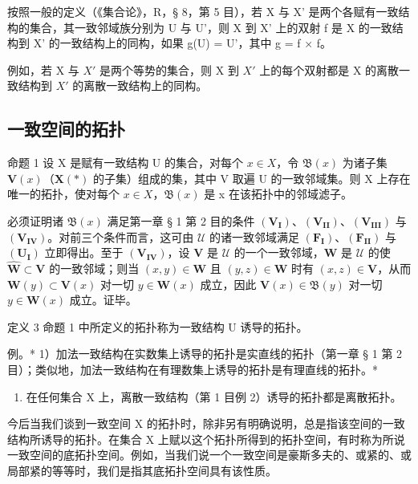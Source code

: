 按照一般的定义（《集合论》，R，§ 8，第 5 目），若 X 与 X' 是两个各赋有一致结构的集合，其一致邻域族分别为 U 与 U'，则 X 到 X' 上的双射 f 是 X 的一致结构到 X' 的一致结构上的同构，如果 g(U) = U'，其中 g = f × f。

例如，若 X 与 \(X'\) 是两个等势的集合，则 X 到 \(X'\) 上的每个双射都是 X 的离散一致结构到 \(X'\) 的离散一致结构上的同构。

\subsection{一致空间的拓扑}

命题 1 设 X 是赋有一致结构 U 的集合，对每个 \(x \in X\)，令 \(\mathfrak{B}(x)\) 为诸子集 \(\mathbf{V}(x)\)（\(\mathbf{X}(*)\) 的子集）组成的集，其中 V 取遍 U 的一致邻域集。则 X 上存在唯一的拓扑，使对每个 \(x \in X\)，\(\mathfrak{B}(x)\) 是 x 在该拓扑中的邻域滤子。

必须证明诸 \(\mathfrak{B}(x)\) 满足第一章 § 1 第 2 目的条件 \((\mathbf{V}_{\mathbf{I}})\)、\((\mathbf{V}_{\mathbf{II}})\)、\((\mathbf{V}_{\mathbf{III}})\) 与 \((\mathbf{V}_{\mathbf{IV}})\)。对前三个条件而言，这可由 \(\mathcal{U}\) 的诸一致邻域满足 \((\mathbf{F}_{\mathbf{I}})\)、\((\mathbf{F}_{\mathbf{II}})\) 与 \((\mathbf{U}_{\mathbf{I}})\) 立即得出。至于 \((\mathbf{V}_{\mathbf{IV}})\)，设 \(\mathbf{V}\) 是 \(\mathcal{U}\) 的一个一致邻域，\(\mathbf{W}\) 是 \(\mathcal{U}\) 的使 \(\hat{\mathbf{W}} \subset \mathbf{V}\) 的一致邻域；则当 \((x, y) \in \mathbf{W}\) 且 \((y, z) \in \mathbf{W}\) 时有 \((x, z) \in \mathbf{V}\)，从而 \(\mathbf{W}(y) \subset \mathbf{V}(x)\) 对一切 \(y \in \mathbf{W}(x)\) 成立，因此 \(\mathbf{V}(x) \in \mathfrak{B}(y)\) 对一切 \(y \in \mathbf{W}(x)\) 成立。证毕。

定义 3 命题 1 中所定义的拓扑称为一致结构 U 诱导的拓扑。

例。* 1）加法一致结构在实数集上诱导的拓扑是实直线的拓扑（第一章 § 1 第 2 目）；类似地，加法一致结构在有理数集上诱导的拓扑是有理直线的拓扑。*

\begin{enumerate}
\def\labelenumi{\arabic{enumi})}
\setcounter{enumi}{1}
\tightlist
\item
  在任何集合 X 上，离散一致结构（第 1 目例 2）诱导的拓扑都是离散拓扑。
\end{enumerate}

今后当我们谈到一致空间 X 的拓扑时，除非另有明确说明，总是指该空间的一致结构所诱导的拓扑。在集合 X 上赋以这个拓扑所得到的拓扑空间，有时称为所说一致空间的底拓扑空间。例如，当我们说一个一致空间是豪斯多夫的、或紧的、或局部紧的等等时，我们是指其底拓扑空间具有该性质。


